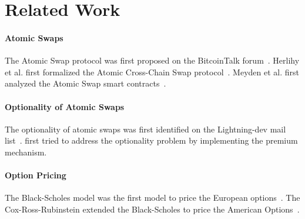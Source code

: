 \section{Related Work}
\label{sec:related_work}


\paragraph{Atomic Swaps}
The Atomic Swap protocol was first proposed on the BitcoinTalk forum~\cite{nolan2013alt}.
Herlihy et al. first formalized the Atomic Cross-Chain Swap protocol~\cite{herlihy2018atomic}.
Meyden et al. first analyzed the Atomic Swap smart contracts~\cite{van2018specification}.

\paragraph{Optionality of Atomic Swaps}
The optionality of atomic swaps was first identified on the Lightning-dev mail list~\cite{optionality-origin}.
\cite{first-attempt-optionality} first tried to address the optionality problem by implementing the premium mechanism.

\paragraph{Option Pricing}
The Black-Scholes model was the first model to price the European options~\cite{black1973pricing}.
The Cox-Ross-Rubinstein extended the Black-Scholes to price the American Options~\cite{cox1979option}.